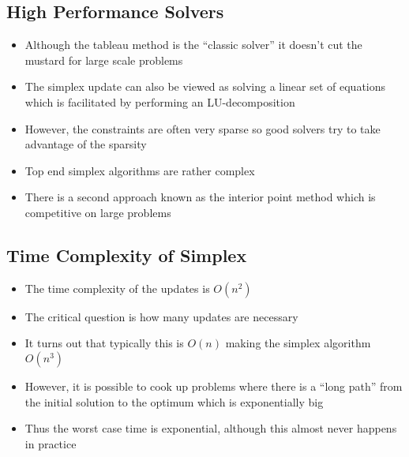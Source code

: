 \begin{slide}
\section[-1]{High Performance Solvers}

\begin{PauseHighLight}
  \begin{itemize}
  \item Although the tableau method is the ``classic solver'' it doesn't
    cut the mustard for large scale problems\pause
  \item The simplex update can also be viewed as solving a linear set of
    equations which is facilitated by performing an LU-decomposition\pause
  \item However, the constraints are often very sparse so good solvers
    try to take advantage of the sparsity\pause
  \item Top end simplex algorithms are rather complex\pause
  \item There is a second approach known as the interior point method
    which is competitive on large problems\pause
  \end{itemize}
\end{PauseHighLight}

\end{slide}


\begin{slide}
\section{Time Complexity of Simplex}

\begin{PauseHighLight}
  \begin{itemize}
  \item The time complexity of the updates is $O(n^2)$\pause
  \item The critical question is how many updates are necessary\pause
  \item It turns out that typically this is $O(n)$ making the simplex
    algorithm $O(n^3)$\pause
  \item However, it is possible to cook up problems where there is a
    ``long path'' from the initial solution to the optimum which is
    exponentially big\pause
  \item Thus the worst case time is exponential, although this almost
    never happens in practice\pause
  \end{itemize}
\end{PauseHighLight}

\end{slide}

